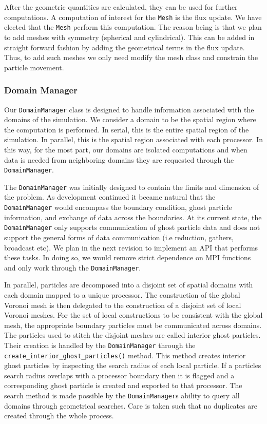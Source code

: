 After the geometric quantities are calculated, they can be used for further computations. A
computation of interest for the \lstinline{Mesh} is the flux update. We have elected
that the \lstinline{Mesh} perform this computation. The reason being is that we plan
to add meshes with symmetry (spherical and cylindrical). This can be added in straight forward
fashion by adding the geometrical terms in the flux update. Thus, to add such meshes we only
need modify the mesh class and constrain the particle movement.

\subsubsection{Domain Manager}
\label{sec.domain.manager}
Our \lstinline{DomainManager} class is designed to handle information associated with
the domains of the simulation. We consider a domain to be the spatial region where the computation
is performed. In serial, this is the entire spatial region of the simulation.
In parallel, this is the spatial region associated with each processor. 
In this way, for the most part, our domains are isolated computations and when
data is needed from neighboring domains they are requested through the \lstinline{DomainManager}.

The \lstinline{DomainManager} was initially designed to contain the limits and dimension of
the problem. As development continued it became natural that the \lstinline{DomainManager} would
encompass the boundary condition, ghost particle information, and exchange of data across the boundaries.
At its current state, the \lstinline{DomainManager} only supports communication of ghost particle data
and does not support the general forms of data communication
(i.e reduction, gathers, broadcast etc). We plan in the next revision to implement an API that
performs these tasks. In doing so, we would remove strict dependence on MPI functions and only
work through the \lstinline{DomainManager}.

In parallel, particles are decomposed into a disjoint set of spatial domains
with each domain mapped to a unique processor. The construction
of the global Voronoi mesh is then delegated to the construction of a disjoint set
of local Voronoi meshes. For the set of local constructions to be consistent
with the global mesh, the appropriate boundary particles must be 
communicated across domains. The particles used to stitch the disjoint meshes are called
interior ghost particles. Their creation is handled by the \lstinline{DomainManager}
through the \lstinline{create_interior_ghost_particles()} method. This method
creates interior ghost particles by inspecting the search radius of
each local particle. If a particles search radius overlaps with a processor
boundary then it is flagged and a corresponding ghost particle is created and exported to that processor.
The search method is made possible by the \lstinline{DomainManager}s ability to query
all domains through geometrical searches. Care is taken such that no duplicates are created through the 
whole process.

